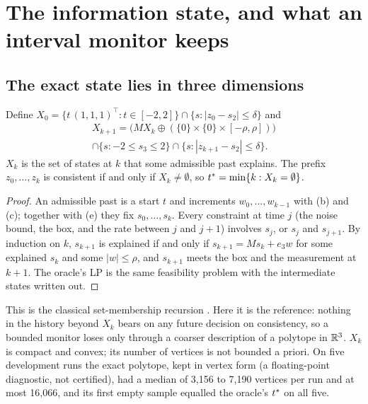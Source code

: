 \section{The information state, and what an interval monitor keeps}

\subsection{The exact state lies in three dimensions}

\begin{proposition}\label{prop:info}
Define $X_0 = \{t\,(1,1,1)^\top : t\in[-2,2]\}\cap\{s : |z_0 - s_2|\le\delta\}$ and
\begin{multline*}
X_{k+1} = \bigl(M X_k\oplus(\{0\}\times\{0\}\times[-\rho,\rho])\bigr)\\
\cap\{s : -2\le s_3\le 2\}\cap\{s : |z_{k+1}-s_2|\le\delta\}.
\end{multline*}
$X_k$ is the set of states at $k$ that some admissible past explains. The prefix $z_0,\dots,z_k$ is consistent if and
only if $X_k\ne\emptyset$, so $t^{\ast} = \min\{k : X_k = \emptyset\}$.
\end{proposition}
\begin{proof}
An admissible past is a start $t$ and increments $w_0,\dots,w_{k-1}$ with (b) and (c); together with (e) they fix
$s_0,\dots,s_k$. Every constraint at time $j$ (the noise bound, the box, and the rate between $j$ and $j+1$) involves
$s_j$, or $s_j$ and $s_{j+1}$. By induction on $k$, $s_{k+1}$ is explained if and only if $s_{k+1} = M s_k + e_3 w$ for
some explained $s_k$ and some $|w|\le\rho$, and $s_{k+1}$ meets the box and the measurement at $k+1$. The oracle's LP is
the same feasibility problem with the intermediate states written out.
\end{proof}

This is the classical set-membership recursion \citep{witsenhausen1968,schweppe1968,bertsekas1971}. Here it is the
reference: nothing in the history beyond $X_k$ bears on any future decision on consistency, so a bounded monitor loses
only through a coarser description of a polytope in $\mathbb{R}^3$. $X_k$ is compact and convex; its number of vertices is not
bounded a priori. On five development runs the exact polytope, kept in vertex form (a floating-point diagnostic, not
certified), had a median of 3,156 to 7,190 vertices per run and at most 16,066, and its first empty sample equalled the
oracle's $t^{\ast}$ on all five.


